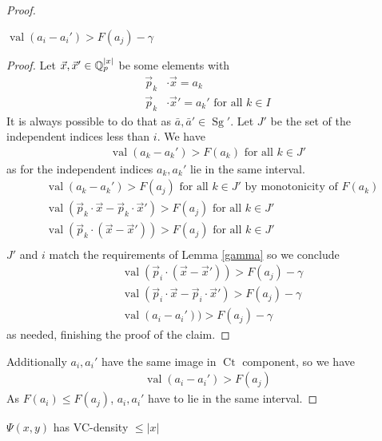 \documentclass{amsart}
\DeclareMathOperator{\Sg}{Sg}
\DeclareMathOperator{\Ct}{Ct}
\DeclareMathOperator{\val}{val}
\begin{document}
\begin{proof}
	\begin{Claim}
		$\val(a_i - a_i') > F(a_j) - \gamma$
	\end{Claim}
	\begin{proof}
		Let $\vec x, \vec x' \in \mathbb{Q}_p^{|x|}$ be some elements with
		\begin{align*}
			\vec p_k &\cdot \vec x = a_k \\
			\vec p_k &\cdot \vec x' = a_k' \text { for all } k \in I
		\end{align*}
		It is always possible to do that as $\bar a, \bar a' \in \Sg'$. 
		Let $J'$ be the set of the independent indices less than $i$.
		We have 
		\begin{align*}
			\val(a_k - a_k') > F(a_k) \text { for all } k \in J'
		\end{align*}
		as for the independent indices $a_k, a_k'$ lie in the same interval.
		\begin{align*}
			&\val(a_k - a_k') > F(a_j) \text { for all } k \in J' \text{ by monotonicity of $F(a_k)$} \\
			&\val(\vec p_k \cdot \vec x - \vec p_k \cdot \vec x') > F(a_j) \text { for all } k \in J' \\
			&\val(\vec p_k \cdot (\vec x - \vec x')) > F(a_j) \text { for all } k \in J' \\
		\end{align*}
		$J'$ and $i$ match the requirements of Lemma \ref {gamma} so we conclude
		\begin{align*}
			&\val(\vec p_i \cdot (\vec x - \vec x')) > F(a_j) - \gamma \\
			&\val(\vec p_i \cdot \vec x - \vec p_i \cdot \vec x') > F(a_j) - \gamma \\
			&\val(a_i - a_i')) > F(a_j) - \gamma
		\end{align*}
		as needed, finishing the proof of the claim.
	\end{proof}	
	Additionally $a_i, a_i'$ have the same image in $\Ct$ component, so we have
	\begin{align*}
		\val(a_i - a_i') > F(a_j) 
	\end{align*}
	As $F(a_i) \leq F(a_j)$, $a_i, a_i'$ have to lie in the same interval.	
\end{proof}

\begin{Corollary}
	$\Psi(x,y)$ has VC-density $\leq |x|$
\end{Corollary}
\end{document}
